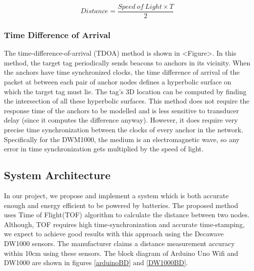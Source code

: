 \documentclass[journal,transmag]{IEEEtran}
\begin{document}
\begin{equation}
\label{eq:distcalc}
    Distance = \frac{Speed\ of\ Light \times T}{2}
\end{equation}

\subsubsection{Time Difference of Arrival}
The time-difference-of-arrival (TDOA) method is shown in <Figure>.  In this method, the target tag periodically sends beacons to anchors in its vicinity.  When the anchors have time synchronized clocks, the time difference of arrival of the packet at between each pair of anchor nodes defines a hyperbolic surface on which the target tag must lie.  The tag's 3D location can be computed by finding the intersection of all these hyperbolic surfaces.  This method does not require the response time of the anchors to be modelled and is less sensitive to transducer delay (since it computes the difference anyway).  However, it does require very precise time synchronization between the clocks of every anchor in the network.  Specifically for the DWM1000, the medium is an electromagnetic wave, so any error in time synchronization gets multiplied by the speed of light. 

\subsection{System Architecture}
In our project, we propose and implement a system which is both accurate enough and energy efficient to be powered by batteries. The proposed method uses Time of Flight(TOF) algorithm to calculate the distance between two nodes. Although, TOF requires high time-synchronization and accurate time-stamping, we expect to achieve good results with this approach using the Decawave DW1000 sensors. The manufacturer claims a distance measurement accuracy within 10cm using these sensors.  The block diagram of Arduino Uno Wifi and DW1000 are shown in figures \ref{arduinoBD} and \ref{DW1000BD}.
\end{document}
